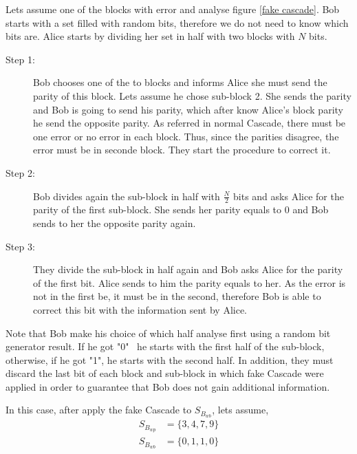 \begin{enumerate}
\begin{enumerate}
            Lets assume one of the blocks with error and analyse figure \ref{fake cascade}. Bob starts with a set filled with random bits, therefore we do not need to know which bits are. Alice starts by dividing her set in half with two blocks with $N$ bits.

            \begin{description}
              \item [Step 1:] Bob chooses one of the to blocks and informs Alice she must send the parity of this block. Lets assume he chose sub-block 2. She sends the parity and Bob is going to send his parity, which after know Alice's block parity he send the opposite parity. As referred in normal Cascade, there must be one error or no error in each block. Thus, since the parities disagree, the error must be in seconde block. They start the procedure to correct it.
              \item [Step 2:] Bob divides again the sub-block in half with $\frac{N}{2}$ bits and asks Alice for the parity of the first sub-block. She sends her parity equals to 0 and Bob sends to her the opposite parity again.

              \item [Step 3:] They divide the sub-block in half again and Bob asks Alice for the parity of the first bit. Alice sends to him the parity equals to her. As the error is not in the first be, it must be in the second, therefore Bob is able to correct this bit with the information sent by Alice.
            \end{description}

            Note that Bob make his choice of which half analyse first using a random bit generator result. If he got "0" \  he starts with the first half of the sub-block, otherwise, if he got "1", he starts with the second half. In addition, they must discard the last bit of each block and sub-block in which fake Cascade were applied in order to guarantee that Bob does not gain additional information.

            In this case, after apply the fake Cascade to $S_{B_{wb}}$, lets assume,
            \begin{align*}
                S_{B_{wp}} & = \{3,4,7,9 \} \\
                S_{B_{wb}} & = \{0,1,1,0 \}
            \end{align*}


      \end{enumerate}
      

\end{enumerate}
